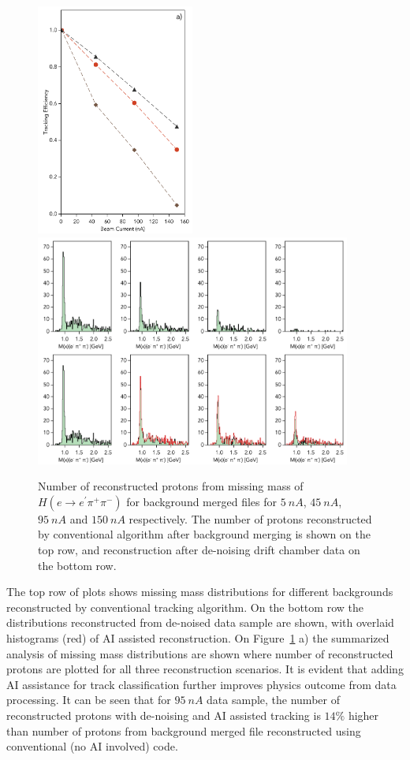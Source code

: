 \begin{figure}[!h]
\begin{center}
 \includegraphics[height=3.0in]{images/figure_phys_scan_ai.pdf}
 \includegraphics[height=3.0in]{images/figure_phys_conv_ai.pdf}
\caption {Number of reconstructed protons from missing mass of $H(e \rightarrow e^\prime \pi^+\pi^-)$ for background 
merged files for  $5~nA$, $45~nA$, $95~nA$ and $150~nA$ respectively. The number of protons reconstructed by 
conventional algorithm after background merging is shown on the top row, and reconstruction after  de-noising drift 
chamber data on the bottom row.}
 \label{physics::conv_dn_ai}
 \end{center}
\end{figure}

The top row of plots shows missing mass distributions for different backgrounds reconstructed by conventional tracking algorithm. On the bottom row the distributions reconstructed from de-noised data sample are shown, with overlaid histograms (red) of AI assisted reconstruction. On Figure~\ref{physics::conv_dn_ai} a) the summarized analysis of missing mass distributions are shown where number of reconstructed protons are plotted for all three reconstruction scenarios. It is evident that adding AI assistance for track classification further improves physics outcome from data processing. It can be seen that for $95~nA$ data sample, the number of reconstructed protons with de-noising and AI assisted tracking is $14\%$ higher than number of protons from background merged file reconstructed using conventional (no AI involved) code.




